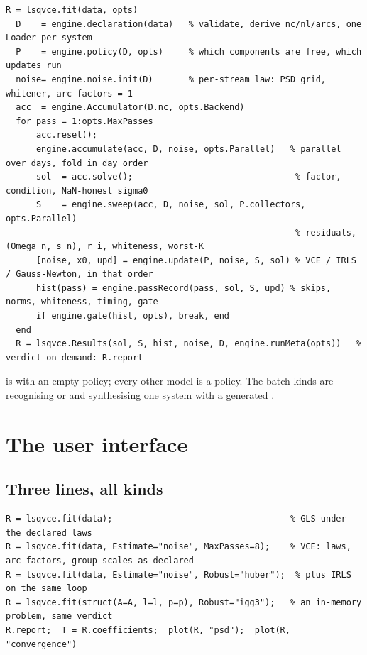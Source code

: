 \begin{lstlisting}
R = lsqvce.fit(data, opts)
  D    = engine.declaration(data)   % validate, derive nc/nl/arcs, one Loader per system
  P    = engine.policy(D, opts)     % which components are free, which updates run
  noise= engine.noise.init(D)       % per-stream law: PSD grid, whitener, arc factors = 1
  acc  = engine.Accumulator(D.nc, opts.Backend)
  for pass = 1:opts.MaxPasses
      acc.reset();
      engine.accumulate(acc, D, noise, opts.Parallel)   % parallel over days, fold in day order
      sol  = acc.solve();                                % factor, condition, NaN-honest sigma0
      S    = engine.sweep(acc, D, noise, sol, P.collectors, opts.Parallel)
                                                         % residuals, (Omega_n, s_n), r_i, whiteness, worst-K
      [noise, x0, upd] = engine.update(P, noise, S, sol) % VCE / IRLS / Gauss-Newton, in that order
      hist(pass) = engine.passRecord(pass, sol, S, upd) % skips, norms, whiteness, timing, gate
      if engine.gate(hist, opts), break, end
  end
  R = lsqvce.Results(sol, S, hist, noise, D, engine.runMeta(opts))   % verdict on demand: R.report
\end{lstlisting}

 is  with an empty policy; every other model is a policy. The batch kinds are  recognising  or  and synthesising one system with a generated .

\chapter{The user interface}
\label{ch:ui}

\section{Three lines, all kinds}

\begin{lstlisting}
R = lsqvce.fit(data);                                   % GLS under the declared laws
R = lsqvce.fit(data, Estimate="noise", MaxPasses=8);    % VCE: laws, arc factors, group scales as declared
R = lsqvce.fit(data, Estimate="noise", Robust="huber");  % plus IRLS on the same loop
R = lsqvce.fit(struct(A=A, l=l, p=p), Robust="igg3");   % an in-memory problem, same verdict
R.report;  T = R.coefficients;  plot(R, "psd");  plot(R, "convergence")
\end{lstlisting}


